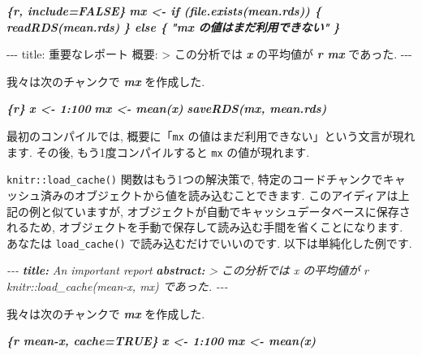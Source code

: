 \documentclass[
  11pt,
  lualatex,
  ja=standard]{bxjsreport}
\newenvironment{Shaded}{\begin{snugshade}}{\end{snugshade}}
\newcommand{\AnnotationTok}[1]{\textcolor[rgb]{0.56,0.35,0.01}{\textbf{\textit{#1}}}}
\newcommand{\CommentTok}[1]{\textcolor[rgb]{0.56,0.35,0.01}{\textit{#1}}}
\newcommand{\InformationTok}[1]{\textcolor[rgb]{0.56,0.35,0.01}{\textbf{\textit{#1}}}}
\newcommand{\NormalTok}[1]{#1}
\begin{document}
\begin{Shaded}
\begin{Highlighting}[]
\InformationTok{\textasciigrave{}\textasciigrave{}\textasciigrave{}\{r, include=FALSE\}}
\InformationTok{mx \textless{}{-} if (file.exists(\textquotesingle{}mean.rds\textquotesingle{})) \{}
\InformationTok{  readRDS(\textquotesingle{}mean.rds\textquotesingle{})}
\InformationTok{\} else \{}
\InformationTok{  "\textasciigrave{}mx\textasciigrave{} の値はまだ利用できない"}
\InformationTok{\}}
\InformationTok{\textasciigrave{}\textasciigrave{}\textasciigrave{}}

\NormalTok{{-}{-}{-}}
\NormalTok{title: 重要なレポート}
\NormalTok{概要: \textgreater{}}
\NormalTok{  この分析では }\InformationTok{\textasciigrave{}x\textasciigrave{}}\NormalTok{ の平均値が}
  \InformationTok{\textasciigrave{}r mx\textasciigrave{}}\NormalTok{ であった.}
\NormalTok{{-}{-}{-}}

\NormalTok{我々は次のチャンクで }\InformationTok{\textasciigrave{}mx\textasciigrave{}}\NormalTok{ を作成した.}

\InformationTok{\textasciigrave{}\textasciigrave{}\textasciigrave{}\{r\}}
\InformationTok{x \textless{}{-} 1:100}
\InformationTok{mx \textless{}{-} mean(x)}
\InformationTok{saveRDS(mx, \textquotesingle{}mean.rds\textquotesingle{})}
\InformationTok{\textasciigrave{}\textasciigrave{}\textasciigrave{}}
\end{Highlighting}
\end{Shaded}

最初のコンパイルでは, 概要に「\texttt{mx} の値はまだ利用できない」という文言が現れます. その後, もう1度コンパイルすると \texttt{mx} の値が現れます.

\texttt{knitr::load\_cache()} 関数はもう1つの解決策で, 特定のコードチャンクでキャッシュ済みのオブジェクトから値を読み込むことできます. このアイディアは上記の例と似ていますが, オブジェクトが自動でキャッシュデータベースに保存されるため, オブジェクトを手動で保存して読み込む手間を省くことになります. あなたは \texttt{load\_cache()} で読み込むだけでいいのです. 以下は単純化した例です.

\begin{Shaded}
\begin{Highlighting}[]
\CommentTok{{-}{-}{-}}
\AnnotationTok{title:}\CommentTok{ An important report}
\AnnotationTok{abstract:}\CommentTok{ \textgreater{}}
\CommentTok{  この分析では \textasciigrave{}x\textasciigrave{} の平均値が}
\CommentTok{  \textasciigrave{}r knitr::load\_cache(\textquotesingle{}mean{-}x\textquotesingle{}, \textquotesingle{}mx\textquotesingle{})\textasciigrave{} であった.}
\CommentTok{{-}{-}{-}}

\NormalTok{我々は次のチャンクで }\InformationTok{\textasciigrave{}mx\textasciigrave{}}\NormalTok{ を作成した.}

\InformationTok{\textasciigrave{}\textasciigrave{}\textasciigrave{}\{r mean{-}x, cache=TRUE\}}
\InformationTok{x \textless{}{-} 1:100}
\InformationTok{mx \textless{}{-} mean(x)}
\InformationTok{\textasciigrave{}\textasciigrave{}\textasciigrave{}}
\end{Highlighting}
\end{Shaded}
\end{document}
